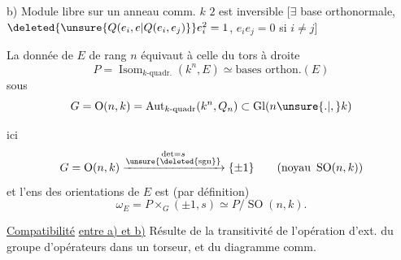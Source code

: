 b) Module  libre   sur un anneau comm. $k$  $2$ est inversible [$\exists$ base orthonormale, $\deleted{\unsure{Q(e_i,e|Q(e_i,e_j)}} e_i^2=1$, $e_i e_j=0$ si $i\ne j$]

La donnée de $E$ de rang $n$ équivaut à celle du tors à droite
\[
 P=\operatorname{Isom}_{k\text{-quadr.}}(k^n,E)\simeq\text{bases orthon.}(E)
\]
sous
\[
 G=\operatorname{O}(n,k)=\operatorname{Aut}_{k\text{-quadr}}(k^n,Q_n)\subset\operatorname{Gl}(n\unsure{.|,}k)
\]

 ici
\[
 G=\operatorname{O}(n,k)\xrightarrow{\substack{\det=s\\\unsure{\deleted{\operatorname{sgn}}}}}\{\pm1\}\qquad(\text{noyau }\operatorname{SO}(n,k))
\]
et l'ens des orientations de $E$ est (par définition)
\[
 \omega_E=P\times_G(\pm1,s)\simeq P/\operatorname{SO}(n,k).
\]

\uline{Compatibilité} \uline{entre a) et b)} Résulte de la transitivité de l'opération d'ext. du groupe d'opérateurs dans un torseur, et du diagramme comm.
